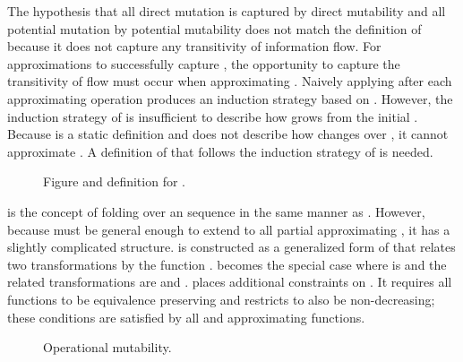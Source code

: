 The hypothesis that all direct mutation is captured by direct mutability and all potential mutation by potential mutability does not match the definition of \TMmutable{} because it does not capture any transitivity of information flow.
For \TMaccessGraph{} approximations to successfully capture \TMmutation{}, the opportunity to capture the transitivity of flow must occur when approximating \TMpotAcc{}.
Naively applying \COQmutable{} after each \TMpotAcc{} approximating operation produces an induction strategy based on \TMpotTransfer{}.
However, the induction strategy of \TMpotTransfer{} is insufficient to describe how \TMmutability{} grows from the initial \TMsubsystem{}.
Because \COQmutable{} is a static definition and does not describe how \TMmutability{} changes over \TMops{}, it cannot approximate \COQmutated{}.
A definition of \TMmutability{} that follows the induction strategy of \COQmutated{} is needed.

\begin{figure}
  \begin{center}
    \FIGgeneralApproxDirAccDep{}
  \end{center}
  
  \COQDOCgeneralMDirAccDep{}
  \COQDOCapproxDirAccDep{}
\caption{Figure and definition for \COQgeneralApproxDirAccDep{}. \label{fig:flow:generalApproxDirAccDep}}
\end{figure}

\Term{\TMmutableExecute} is the concept of folding \COQmutable{} over an \TMop{} sequence in the same manner as \COQmutated{}.
However, because \TMmutableExecute{} must be general enough to extend to all partial \TMpotTransfers{} approximating \COQdirAccExecute{}, it has a slightly complicated structure.
\COQgeneralApproxDirAccDep{} is constructed as a generalized form of \COQpotAccApproxDirAccDep{} that relates two \TMaccessGraph{} transformations by the function .
\COQpotAccApproxDirAccDep{} becomes the special case where  is \COQpotAccFun{} and the related transformations are \COQdirAccExecute{} and \COQpotAccExecute{}.
\COQapproxDirAccDep{} places additional constraints on \COQgeneralApproxDirAccDep{}.
It requires all functions to be equivalence preserving and restricts  to also be non-decreasing; these conditions are satisfied by all \TMpotTransfers{} and approximating functions.

\begin{figure}
  \COQDOCindexed
  \COQDOCmutableExecute
  \caption{Operational mutability. \label{fig:flow:mutableExecute}}
\end{figure}

